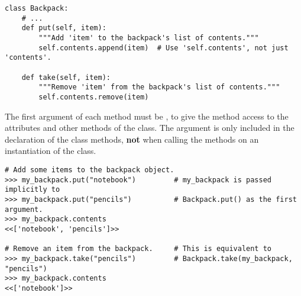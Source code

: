 \begin{lstlisting}
class Backpack:
    # ...
    def put(self, item):
        """Add 'item' to the backpack's list of contents."""
        self.contents.append(item)  # Use 'self.contents', not just 'contents'.

    def take(self, item):
        """Remove 'item' from the backpack's list of contents."""
        self.contents.remove(item)
\end{lstlisting}

The first argument of each method must be , to give the method access to the attributes and other methods of the class.
The  argument is only included in the declaration of the class methods, \textbf{not} when calling the methods on an instantiation of the class.

\begin{lstlisting}
# Add some items to the backpack object.
>>> my_backpack.put("notebook")         # my_backpack is passed implicitly to
>>> my_backpack.put("pencils")          # Backpack.put() as the first argument.
>>> my_backpack.contents
<<['notebook', 'pencils']>>

# Remove an item from the backpack.     # This is equivalent to
>>> my_backpack.take("pencils")         # Backpack.take(my_backpack, "pencils")
>>> my_backpack.contents
<<['notebook']>>
\end{lstlisting}

